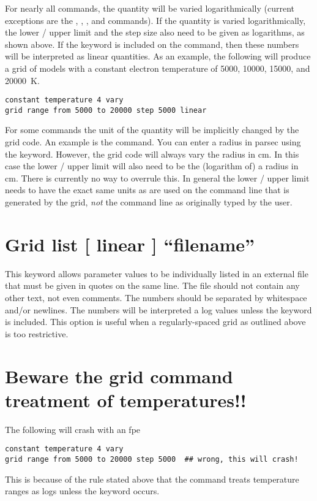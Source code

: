 For nearly all commands, the quantity will be varied logarithmically (current
exceptions are the , ,
, and  commands). If the quantity is varied
logarithmically, the lower / upper limit and the step size also need to be
given as logarithms, as shown above. If the keyword  is
included on the  command, then these numbers will be
interpreted as linear quantities. As an example, the following will produce a
grid of models with a constant electron temperature of 5000, 10000, 15000, and
20000~K.
\begin{verbatim}
constant temperature 4 vary
grid range from 5000 to 20000 step 5000 linear
\end{verbatim}

For some commands the unit of the quantity will be implicitly changed by the
grid code. An example is the  command. You can enter a
radius in parsec using the  keyword. However, the grid code
will always vary the radius in cm. In this case the lower / upper limit will
also need to be the (logarithm of) a radius in cm. There is currently no way
to overrule this. In general the lower / upper limit needs to have the exact
same units as are used on the command line that is generated by the grid,
\emph{not} the command line as originally typed by the user.

\section{Grid list [ linear ] ``filename''}

This  keyword allows parameter values to be individually
listed in an external file that must be given in quotes on the same line. The
file should not contain any other text, not even comments. The numbers should
be separated by whitespace and/or newlines. The numbers will be interpreted a
log values unless the  keyword is included. This option is
useful when a regularly-spaced grid as outlined above is too restrictive.

\section{Beware the grid command treatment of temperatures!!}
\label{sec:GridTemperatureGotcha}
The following will crash with an fpe
\begin{verbatim}
constant temperature 4 vary
grid range from 5000 to 20000 step 5000  ## wrong, this will crash!
\end{verbatim}
This is because of the rule stated above that the  command
treats temperature ranges as logs unless the keyword
 occurs.  

